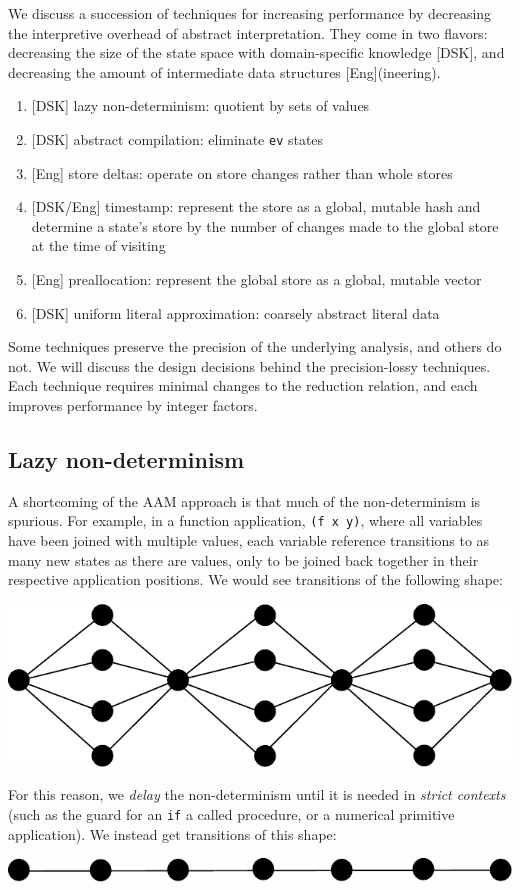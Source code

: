\documentclass[preprint,onecolumn,9pt]{sigplanconf} %
\begin{document}
We discuss a succession of techniques for increasing performance by
decreasing the interpretive overhead of abstract interpretation. They
come in two flavors: decreasing the size of the state space with domain-specific knowledge [DSK], and
decreasing the amount of intermediate data structures [Eng](ineering).

\begin{enumerate}
 \item{[DSK] lazy non-determinism: quotient by sets of values}
 \item{[DSK] abstract compilation: eliminate {\tt ev} states}
 \item{[Eng] store deltas: operate on store changes rather than whole stores}
 \item{[DSK/Eng] timestamp: represent the store as a global, mutable
   hash and determine a state's store by the number of changes made to
   the global store at the time of visiting}
 \item{[Eng] preallocation: represent the global store as a global, mutable vector}
 \item{[DSK] uniform literal approximation: coarsely abstract literal data}
\end{enumerate}

Some techniques preserve the precision of the underlying analysis, and
others do not. We will discuss the design decisions behind the
precision-lossy techniques.  Each technique requires minimal changes
to the reduction relation, and each improves performance by
integer factors.

\subsection{Lazy non-determinism}

A shortcoming of the AAM approach is that much of the non-determinism
is spurious. For example, in a function application, {\tt (f x y)},
where all variables have been joined with multiple values, each
variable reference transitions to as many new states as there are
values, only to be joined back together in their respective
application positions. We would see transitions of the following
shape:
\begin{center}
\includegraphics[scale=0.3]{fanout.pdf}
\end{center}
For this reason, we {\it delay} the non-determinism
until it is needed in {\it strict contexts} (such as the guard for an
{\tt if} a called procedure, or a numerical primitive application). We instead get transitions of this shape:
\begin{center}
\includegraphics[scale=0.3]{lazy.pdf}
\end{center}
\end{document}

